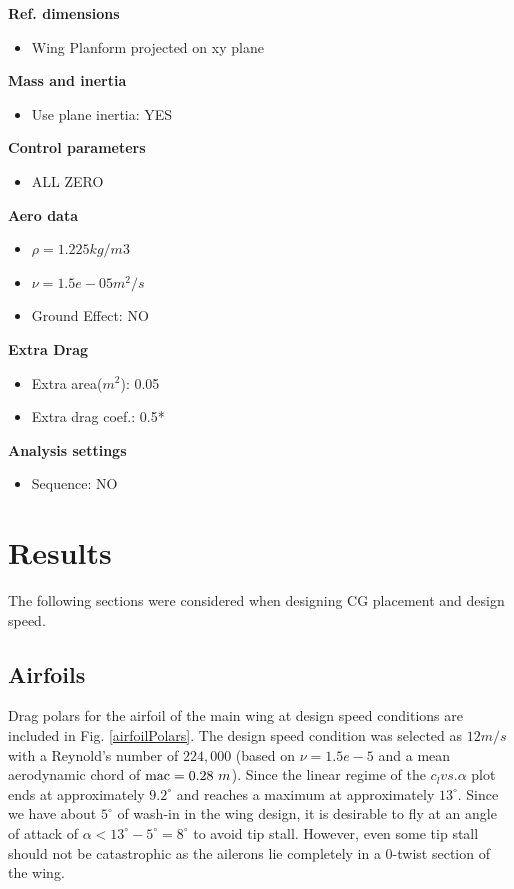 \documentclass[]{auvsi_doc}
\begin{document}
\textbf{Ref. dimensions}
\begin{itemize}
	\item Wing Planform projected on xy plane
\end{itemize}

\textbf{Mass and inertia}
\begin{itemize}
	\item Use plane inertia: YES
\end{itemize}

\textbf{Control parameters}
\begin{itemize}
	\item ALL ZERO
\end{itemize}

\textbf{Aero data}
\begin{itemize}
	\item $\rho = 1.225 kg/m3$
	\item $\nu = 1.5e-05 m^2/s$
	\item Ground Effect: NO
\end{itemize}

\textbf{Extra Drag}
\begin{itemize}
	\item Extra area($m^2$): 0.05
	\item Extra drag coef.: 0.5*
\end{itemize}

\textbf{Analysis settings}
\begin{itemize}
	\item Sequence: NO
\end{itemize}



\section{Results}
The following sections were considered when designing CG placement and design speed.

\subsection{Airfoils}
Drag polars for the airfoil of the main wing at design speed conditions are included in Fig. \ref{airfoilPolars}. The  design speed condition was selected as $12m/s$ with a Reynold's number of $224,000$ (based on $\nu=1.5e-5$ and a mean aerodynamic chord of $\textnormal{mac}=0.28~m$). Since the linear regime of the $c_l vs. \alpha$ plot ends at approximately $9.2^\circ$ and reaches a maximum at approximately $13^\circ$. Since we have about $5^\circ$ of wash-in in the wing design, it is desirable to fly at an angle of attack of $\alpha < 13^\circ - 5^\circ = 8^\circ$ to avoid tip stall. However, even some tip stall should not be catastrophic as the ailerons lie completely in a 0-twist section of the wing.
\end{document}
